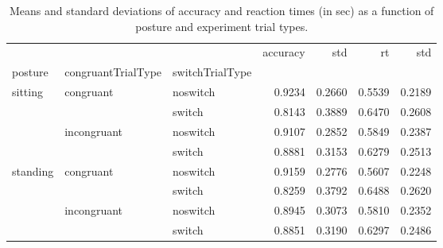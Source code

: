 \begin{table}
\centering
\caption{Means and standard deviations of accuracy and reaction times (in sec) as a function of posture and experiment trial types.}
\label{table-task-switching-replication-reaction-time}
\begin{tabular}{lllrrrr}
\toprule
         &             &        & accuracy &    std &     rt &    std \\
posture & congruantTrialType & switchTrialType &          &        &        &        \\
\midrule
sitting & congruant & noswitch &   0.9234 & 0.2660 & 0.5539 & 0.2189 \\
         &             & switch &   0.8143 & 0.3889 & 0.6470 & 0.2608 \\
         & incongruant & noswitch &   0.9107 & 0.2852 & 0.5849 & 0.2387 \\
         &             & switch &   0.8881 & 0.3153 & 0.6279 & 0.2513 \\
standing & congruant & noswitch &   0.9159 & 0.2776 & 0.5607 & 0.2248 \\
         &             & switch &   0.8259 & 0.3792 & 0.6488 & 0.2620 \\
         & incongruant & noswitch &   0.8945 & 0.3073 & 0.5810 & 0.2352 \\
         &             & switch &   0.8851 & 0.3190 & 0.6297 & 0.2486 \\
\bottomrule
\end{tabular}
\end{table}
